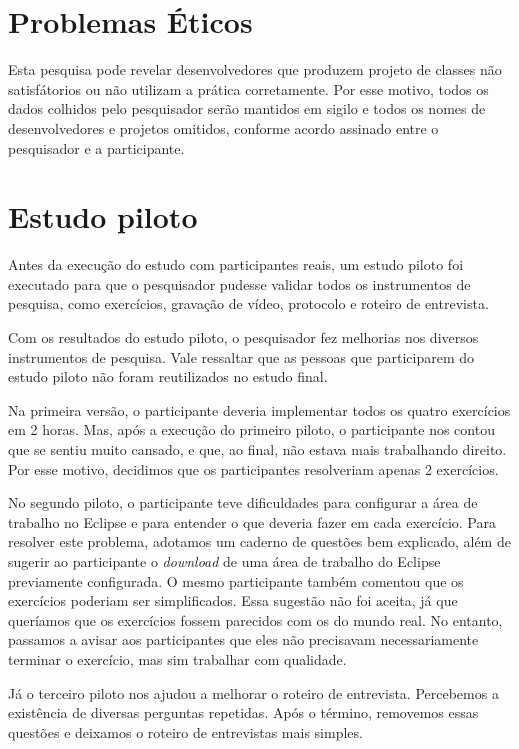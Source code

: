 \section{Problemas Éticos}
\label{sec:planejamento-etica}

Esta pesquisa pode revelar desenvolvedores que produzem projeto de classes não
satisfátorios ou não utilizam a prática corretamente.
Por esse motivo, todos os dados colhidos pelo pesquisador serão mantidos em
sigilo e todos os nomes de desenvolvedores e projetos omitidos, conforme acordo 
assinado entre o pesquisador e a participante.

\section{Estudo piloto}
\label{sec:estudo-piloto}

Antes da execução do estudo com participantes reais, um estudo piloto foi
executado para que o pesquisador pudesse validar todos os instrumentos de pesquisa,
como exercícios, gravação de vídeo, protocolo e roteiro de entrevista.

Com os resultados do estudo piloto, o pesquisador fez melhorias
nos diversos instrumentos de pesquisa.
Vale ressaltar que as pessoas que participarem do estudo piloto não foram reutilizados no
estudo final.

Na primeira versão, o participante deveria implementar todos os quatro exercícios em 2 horas.
Mas, após a execução do primeiro piloto, o participante nos contou que se sentiu muito cansado, e
que, ao final, não estava mais trabalhando direito. Por esse motivo, decidimos que
os participantes resolveriam apenas 2 exercícios.

No segundo piloto, o participante teve dificuldades para configurar a área de trabalho no Eclipse e
para entender o que deveria fazer em cada exercício. Para resolver este problema, adotamos um 
caderno de questões bem explicado, além de sugerir ao participante o \textit{download} de uma
área de trabalho do Eclipse previamente configurada.
O mesmo participante também comentou que os exercícios poderiam ser simplificados. Essa sugestão
não foi aceita, já que queríamos que os exercícios fossem parecidos com os do mundo real. No entanto,
passamos a avisar aos participantes que eles não precisavam necessariamente terminar o exercício,
mas sim trabalhar com qualidade.

Já o terceiro piloto nos ajudou a melhorar o roteiro de entrevista. Percebemos a existência de diversas perguntas
repetidas. Após o término, removemos essas questões e deixamos o roteiro de entrevistas mais simples.
